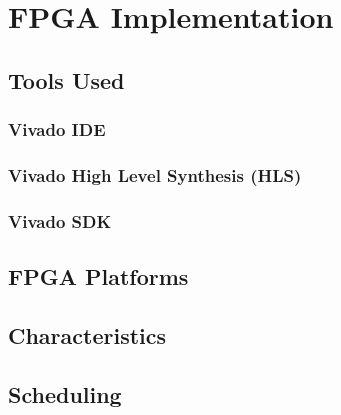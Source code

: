 \chapter{FPGA Implementation}

\label{Chapter-FPGA-Implementation}

\section{Tools Used}
\subsection{Vivado IDE}
\subsection{Vivado High Level Synthesis (HLS)}
\subsection{Vivado SDK}

\section{FPGA Platforms}

\section{Characteristics}

\section{Scheduling}

